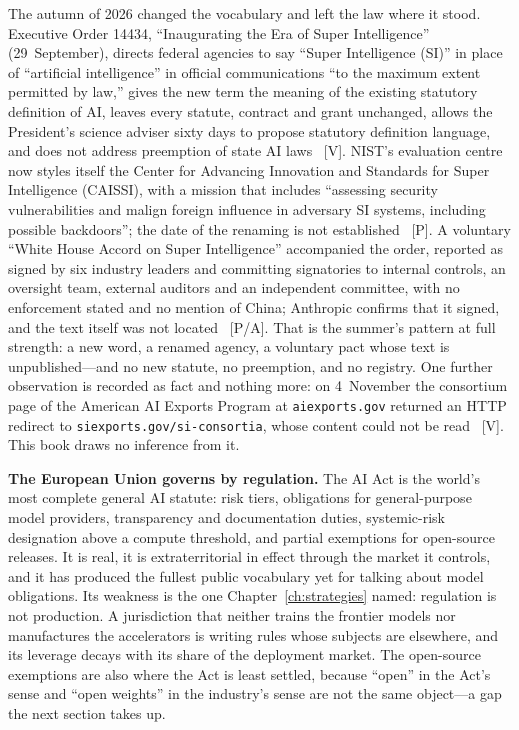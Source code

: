 The autumn of 2026 changed the vocabulary and left the law where it stood. Executive Order 14434, ``Inaugurating the Era of Super Intelligence'' (29~September), directs federal agencies to say ``Super Intelligence (SI)'' in place of ``artificial intelligence'' in official communications ``to the maximum extent permitted by law,'' gives the new term the meaning of the existing statutory definition of AI, leaves every statute, contract and grant unchanged, allows the President's science adviser sixty days to propose statutory definition language, and does not address preemption of state AI laws~\cite{gov-eo14434} [V]. NIST's evaluation centre now styles itself the Center for Advancing Innovation and Standards for Super Intelligence (CAISSI), with a mission that includes ``assessing security vulnerabilities and malign foreign influence in adversary SI systems, including possible backdoors''; the date of the renaming is not established~\cite{gov-caissi} [P]. A voluntary ``White House Accord on Super Intelligence'' accompanied the order, reported as signed by six industry leaders and committing signatories to internal controls, an oversight team, external auditors and an independent committee, with no enforcement stated and no mention of China; Anthropic confirms that it signed, and the text itself was not located~\cite{gov-wh-accord} [P/A]. That is the summer's pattern at full strength: a new word, a renamed agency, a voluntary pact whose text is unpublished---and no new statute, no preemption, and no registry. One further observation is recorded as fact and nothing more: on 4~November the consortium page of the American AI Exports Program at \texttt{aiexports.gov} returned an HTTP redirect to \texttt{siexports.gov/si-consortia}, whose content could not be read~\cite{gov-aiexports-redirect} [V]. This book draws no inference from it.

\textbf{The European Union governs by regulation.} The AI Act is the world's most complete general AI statute: risk tiers, obligations for general-purpose model providers, transparency and documentation duties, systemic-risk designation above a compute threshold, and partial exemptions for open-source releases. It is real, it is extraterritorial in effect through the market it controls, and it has produced the fullest public vocabulary yet for talking about model obligations. Its weakness is the one Chapter~\ref{ch:strategies} named: regulation is not production. A jurisdiction that neither trains the frontier models nor manufactures the accelerators is writing rules whose subjects are elsewhere, and its leverage decays with its share of the deployment market. The open-source exemptions are also where the Act is least settled, because ``open'' in the Act's sense and ``open weights'' in the industry's sense are not the same object---a gap the next section takes up.

